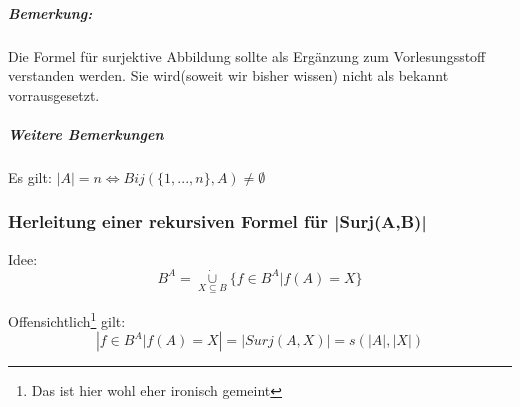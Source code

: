 \subparagraph*{Bemerkung:} Die Formel für surjektive Abbildung sollte als Ergänzung zum Vorlesungsstoff verstanden werden. 
Sie wird(soweit wir bisher wissen) nicht als bekannt vorrausgesetzt.

\subparagraph{Weitere Bemerkungen}
Es gilt:
$ |A| = n \Longleftrightarrow Bij( \{1, ... , n\},A) \neq \emptyset$

\subsubsection{Herleitung einer rekursiven Formel für |Surj(A,B)| }
Idee: $$ B^A =  \underset {{X}\subseteq{B}} {\mathbin{\dot{\cup}}} {\{ f\in B^A | f(A) = X \}} $$

Offensichtlich\footnote{Das ist hier wohl eher ironisch gemeint} gilt: $$ | {f \in B^A | f(A) = X} | = |Surj(A,X)| = s(|A|, |X|) $$